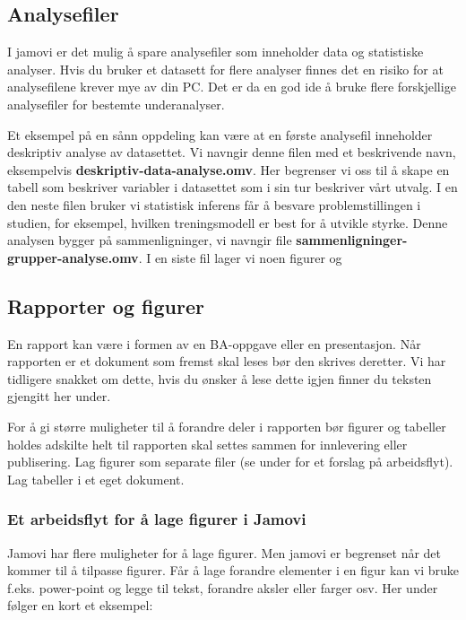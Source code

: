 \documentclass[
  letterpaper,
  DIV=11,
  numbers=noendperiod,
  oneside]{scrreprt}
\begin{document}
\hypertarget{analysefiler}{%
\subsection{Analysefiler}\label{analysefiler}}

I jamovi er det mulig å spare analysefiler som inneholder data og
statistiske analyser. Hvis du bruker et datasett for flere analyser
finnes det en risiko for at analysefilene krever mye av din PC. Det er
da en god ide å bruke flere forskjellige analysefiler for bestemte
underanalyser.

Et eksempel på en sånn oppdeling kan være at en første analysefil
inneholder deskriptiv analyse av datasettet. Vi navngir denne filen med
et beskrivende navn, eksempelvis \textbf{deskriptiv-data-analyse.omv}.
Her begrenser vi oss til å skape en tabell som beskriver variabler i
datasettet som i sin tur beskriver vårt utvalg. I en den neste filen
bruker vi statistisk inferens får å besvare problemstillingen i studien,
for eksempel, hvilken treningsmodell er best for å utvikle styrke. Denne
analysen bygger på sammenligninger, vi navngir file
\textbf{sammenligninger-grupper-analyse.omv}. I en siste fil lager vi
noen figurer og

\hypertarget{rapporter-og-figurer}{%
\subsection{Rapporter og figurer}\label{rapporter-og-figurer}}

En rapport kan være i formen av en BA-oppgave eller en presentasjon. Når
rapporten er et dokument som fremst skal leses bør den skrives deretter.
Vi har tidligere snakket om dette, hvis du ønsker å lese dette igjen
finner du teksten gjengitt her under.

For å gi større muligheter til å forandre deler i rapporten bør figurer
og tabeller holdes adskilte helt til rapporten skal settes sammen for
innlevering eller publisering. Lag figurer som separate filer (se under
for et forslag på arbeidsflyt). Lag tabeller i et eget dokument.

\hypertarget{et-arbeidsflyt-for-uxe5-lage-figurer-i-jamovi}{%
\subsubsection{Et arbeidsflyt for å lage figurer i
Jamovi}\label{et-arbeidsflyt-for-uxe5-lage-figurer-i-jamovi}}

Jamovi har flere muligheter for å lage figurer. Men jamovi er begrenset
når det kommer til å tilpasse figurer. Får å lage forandre elementer i
en figur kan vi bruke f.eks. power-point og legge til tekst, forandre
aksler eller farger osv. Her under følger en kort et eksempel:
\end{document}
